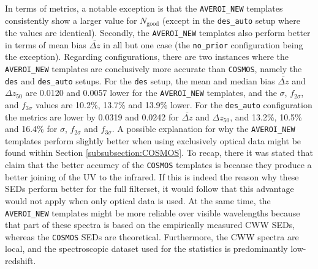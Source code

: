 In terms of metrics, a notable exception is that the \texttt{AVEROI\_NEW} templates consistently show a larger value for $N_{\mathrm{good}}$ (except in the \texttt{des\_auto} setup where the values are identical). Secondly, the \texttt{AVEROI\_NEW} templates also perform better in terms of mean bias $\overbar{\Delta z}$ in all but one case (the \texttt{no\_prior} configuration being the exception). Regarding configurations, there are two instances where the \texttt{AVEROI\_NEW} templates are conclusively more accurate than \texttt{COSMOS}, namely the \texttt{des} and \texttt{des\_auto} setups. For the \texttt{des} setup, the mean and median bias $\overbar{\Delta z}$ and $\Delta z_{50}$ are 0.0120 and 0.0057 lower for the \texttt{AVEROI\_NEW} templates, and the $\sigma $, $f_{2\sigma}$, and $f_{3\sigma}$ values are 10.2\%, 13.7\% and 13.9\% lower. For the \texttt{des\_auto} configuration the metrics are lower by 0.0319 and 0.0242 for $\overbar{\Delta z}$ and $\Delta z_{50}$, and 13.2\%, 10.5\% and 16.4\% for $\sigma$, $f_{2\sigma}$ and $f_{3\sigma}$. A possible explanation for why the \texttt{AVEROI\_NEW} templates perform slightly better when using exclusively optical data might be found within Section \ref{subsubsection:COSMOS}. To recap, there it was stated that \cite{2009ApJ...690.1236I} claim that the better accuracy of the \texttt{COSMOS} templates is because they produce a better joining of the UV to the infrared. If this is indeed the reason why these SEDs perform better for the full \DESVIDEO filterset, it would follow that this advantage would not apply when only optical data is used. At the same time, the \texttt{AVEROI\_NEW} templates might be more reliable over visible wavelengths because that part of these spectra is based on the empirically measured CWW SEDs, whereas the \texttt{COSMOS} SEDs are theoretical. Furthermore, the CWW spectra are local, and the spectroscopic dataset used for the statistics is predominantly low-redshift. \par

